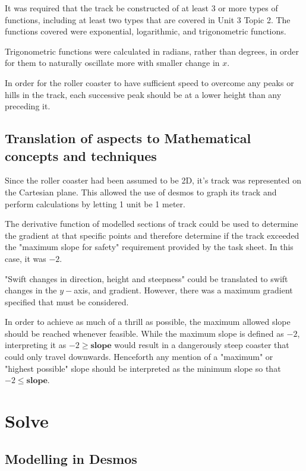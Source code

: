 \documentclass[11pt, letterpaper]{article}
\begin{document}
It was required that the track be constructed of at least 3 or more types of functions, including at least two types that are covered in Unit 3 Topic 2. The functions covered were exponential, logarithmic, and trigonometric functions.
	
Trigonometric functions were calculated in radians, rather than degrees, in order for them to naturally oscillate more with smaller change in $x$.

In order for the roller coaster to have sufficient speed to overcome any peaks or hills in the track, each successive peak should be at a lower height than any preceding it.

	




\subsection{Translation of aspects to Mathematical concepts and techniques}

Since the roller coaster had been assumed to be 2D, it's track was represented on the Cartesian plane. This allowed the use of desmos to graph its track and perform calculations by letting 1 unit be 1 meter. 

The derivative function of modelled sections of track could be used to determine the gradient at that specific points and therefore determine if the track exceeded the "maximum slope for safety" requirement provided by the task sheet. In this case, it was $-2$.

"Swift changes in direction, height and steepness" could be translated to swift changes in the $y-$axis, and gradient. However, there was a maximum gradient specified that must be considered. 

In order to achieve as much of a thrill as possible, the maximum allowed slope should be reached whenever feasible.
While the maximum slope is defined as $-2$, interpreting it as $-2\geq \textbf{slope}$ would result in a dangerously steep coaster that could only travel downwards. Henceforth any mention of a "maximum" or "highest possible" slope should be interpreted as the minimum slope so that $-2\leq \textbf{slope}$.




\section{Solve}
\subsection{Modelling in Desmos}
\end{document}
